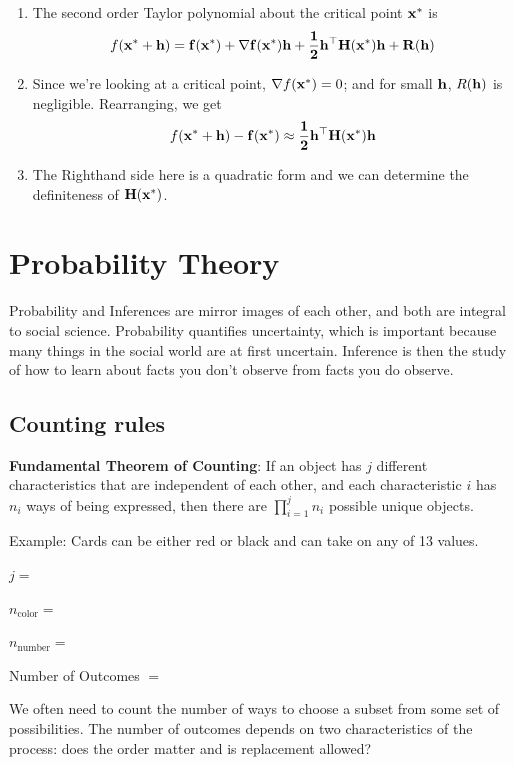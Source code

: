 \documentclass[]{book}
\providecommand{\tightlist}{%
  \setlength{\itemsep}{0pt}\setlength{\parskip}{0pt}}
\theoremstyle{definition}
\theoremstyle{definition}
\theoremstyle{definition}
\theoremstyle{remark}
\begin{document}
\begin{enumerate}
\def\labelenumi{\arabic{enumi}.}
\tightlist
\item
  The second order Taylor polynomial about the critical point
  \({\bf x}^*\) is
  \[f({\bf x}^*+\bf h)=f({\bf x}^*)+\nabla f({\bf x}^*) \bf h +\frac{1}{2} \bf h^\top
  {\bf H(x^*)} \bf h + R(\bf h)\]
\item
  Since we're looking at a critical point, \(\nabla f({\bf x}^*)=0\);
  and for small \(\bf h\), \(R(\bf h)\) is negligible. Rearranging, we get
  \[f({\bf x}^*+\bf h)-f({\bf x}^*)\approx \frac{1}{2} \bf h^\top {\bf H(x^*)}
  \bf h \]
\item
  The Righthand side here is a quadratic form and we can determine the definiteness of \(\bf H(x^*)\).
\end{enumerate}

\hypertarget{probability-theory}{%
\chapter{Probability Theory}\label{probability-theory}}

Probability and Inferences are mirror images of each other, and both are integral to social science. Probability quantifies uncertainty, which is important because many things in the social world are at first uncertain. Inference is then the study of how to learn about facts you don't observe from facts you do observe.

\hypertarget{counting-rules}{%
\section{Counting rules}\label{counting-rules}}

\textbf{Fundamental Theorem of Counting}: If an object has \(j\) different characteristics that are independent of each other, and each characteristic \(i\) has \(n_i\) ways of being expressed, then there are \(\prod_{i = 1}^j n_i\) possible unique objects.

Example: Cards can be either red or black and can take on any of 13 values.

\(j =\)

\(n_{\text{color}} =\)

\(n_{\text{number}} =\)

Number of Outcomes \(=\)

We often need to count the number of ways to choose a subset from some set of possibilities. The number of outcomes depends on two characteristics of the process: does the order matter and is replacement allowed?
\end{document}

